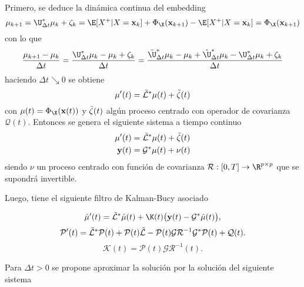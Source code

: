 Primero, se deduce la dinámica continua del embedding
\[
\mu_{k+1} = \U^*_{\Delta t} \mu_k + \zeta_k = \E [X^+ | X = \mathbf{x}_k] + \Phi_\X (\mathbf{x}_{k+1}) - \E [X^+ | X = \mathbf{x}_k]  = \Phi_\X (\mathbf{x}_{k+1})
\]
con lo que
\[
\frac{\mu_{k+1} - \mu_k}{\Delta t} = \frac{\U^*_{\Delta t} \mu_k - \mu_k + \zeta_k}{\Delta t} = \frac{\Tilde{\U}^*_{\Delta t} \mu_k - \mu_k + \Tilde{\U}^*_{\Delta t} \mu_k - \U^*_{\Delta t} \mu_k + \zeta_k}{\Delta t}
\]
haciendo $\Delta t \searrow 0$ se obtiene
\[
\mu'(t) = \Tilde{\mathcal{L}}^* \mu(t) + \Tilde{\zeta} (t)
\]
con $\mu(t) = \Phi_\X (\mathbf{x}(t))$ y $\Tilde{\zeta}(t)$ algún proceso centrado con operador de covarianza $\mathcal{Q}(t)$.
Entonces se genera el siguiente sistema a tiempo continuo
\begin{equation*}
    \begin{aligned}
        \mu'(t) &= \Tilde{\mathcal{L}}^* \mu(t) + \Tilde{\zeta}(t) \\
        \mathbf{y}(t) &= \mathcal{G}^* \mu(t) + \nu (t)
    \end{aligned}
\end{equation*}
siendo $\nu$ un proceso centrado con función de covarianza $\mathcal{R}:[0, T] \to \R^{p \times p}$ que se supondrá invertible.

Luego, tiene el siguiente filtro de Kalman-Bucy asociado

\begin{equation*}
    \hat{\mu}'(t) = \Tilde{\mathcal{L}}^*\hat{\mu}(t)  + \K(t) \big( \mathbf{y}(t) - \mathcal{G}^*\hat{\mu}(t) \big),
\end{equation*}
\begin{equation*}
    \mathcal{P}'(t) = \Tilde{\mathcal{L}}^*\mathcal{P}(t) + \mathcal{P}(t)\Tilde{\mathcal{L}} - \mathcal{P}(t)\mathcal{G}\mathcal{R}^{-1}\mathcal{G}^*\mathcal{P}(t) + \mathcal{Q}(t).
\end{equation*}
\begin{equation*}
    \mathcal{K}(t) = \mathcal{P}(t)\mathcal{G}\mathcal{R}^{-1}(t).
\end{equation*}

Para $\Delta t > 0$ se propone aproximar la solución por la solución del siguiente sistema

